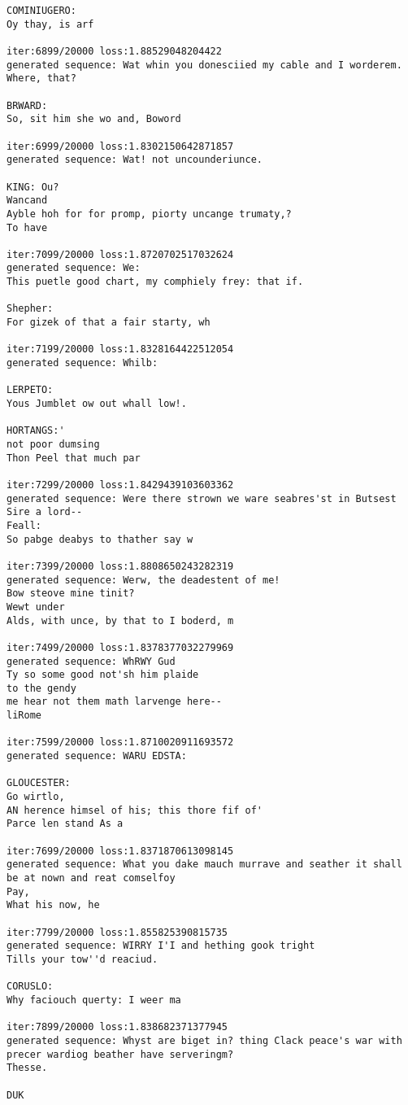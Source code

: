 \documentclass[11pt]{article}
\begin{document}
\begin{Verbatim}[commandchars=\\\{\}]
COMINIUGERO:
Oy thay, is arf

iter:6899/20000 loss:1.88529048204422
generated sequence: Wat whin you donesciied my cable and I worderem.
Where, that?

BRWARD:
So, sit him she wo and, Boword

iter:6999/20000 loss:1.8302150642871857
generated sequence: Wat! not uncounderiunce.

KING: Ou?
Wancand
Ayble hoh for for promp, piorty uncange trumaty,?
To have

iter:7099/20000 loss:1.8720702517032624
generated sequence: We:
This puetle good chart, my comphiely frey: that if.

Shepher:
For gizek of that a fair starty, wh

iter:7199/20000 loss:1.8328164422512054
generated sequence: Whilb:

LERPETO:
Yous Jumblet ow out whall low!.

HORTANGS:'
not poor dumsing
Thon Peel that much par

iter:7299/20000 loss:1.8429439103603362
generated sequence: Were there strown we ware seabres'st in Butsest
Sire a lord--
Feall:
So pabge deabys to thather say w

iter:7399/20000 loss:1.8808650243282319
generated sequence: Werw, the deadestent of me!
Bow steove mine tinit?
Wewt under
Alds, with unce, by that to I boderd, m

iter:7499/20000 loss:1.8378377032279969
generated sequence: WhRWY Gud
Ty so some good not'sh him plaide
to the gendy
me hear not them math larvenge here--
liRome

iter:7599/20000 loss:1.8710020911693572
generated sequence: WARU EDSTA:

GLOUCESTER:
Go wirtlo,
AN herence himsel of his; this thore fif of'
Parce len stand As a

iter:7699/20000 loss:1.8371870613098145
generated sequence: What you dake mauch murrave and seather it shall be at nown and reat comselfoy
Pay,
What his now, he 

iter:7799/20000 loss:1.855825390815735
generated sequence: WIRRY I'I and hething gook tright
Tills your tow''d reaciud.

CORUSLO:
Why faciouch querty: I weer ma

iter:7899/20000 loss:1.838682371377945
generated sequence: Whyst are biget in? thing Clack peace's war with precer wardiog beather have serveringm?
Thesse.

DUK


\end{Verbatim}
\end{document}

